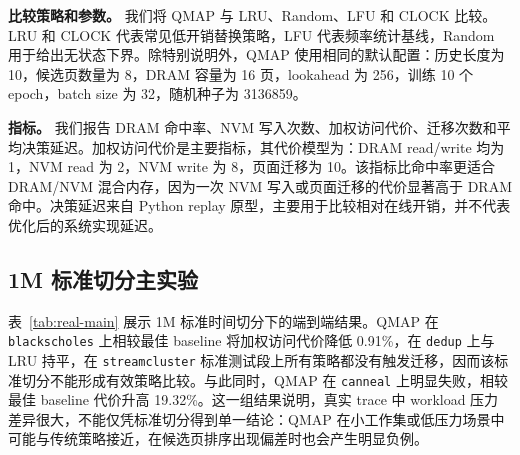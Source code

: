 \textbf{比较策略和参数。}
我们将 QMAP 与 LRU、Random、LFU 和 CLOCK 比较。LRU 和 CLOCK 代表常见低开销替换策略，LFU 代表频率统计基线，Random 用于给出无状态下界。除特别说明外，QMAP 使用相同的默认配置：历史长度为 10，候选页数量为 8，DRAM 容量为 16 页，lookahead 为 256，训练 10 个 epoch，batch size 为 32，随机种子为 3136859。

\textbf{指标。}
我们报告 DRAM 命中率、NVM 写入次数、加权访问代价、迁移次数和平均决策延迟。加权访问代价是主要指标，其代价模型为：DRAM read/write 均为 1，NVM read 为 2，NVM write 为 8，页面迁移为 10。该指标比命中率更适合 DRAM/NVM 混合内存，因为一次 NVM 写入或页面迁移的代价显著高于 DRAM 命中。决策延迟来自 Python replay 原型，主要用于比较相对在线开销，并不代表优化后的系统实现延迟。

\subsection{1M 标准切分主实验}

表~\ref{tab:real-main} 展示 1M 标准时间切分下的端到端结果。QMAP 在 \texttt{blackscholes} 上相较最佳 baseline 将加权访问代价降低 0.91\%，在 \texttt{dedup} 上与 LRU 持平，在 \texttt{streamcluster} 标准测试段上所有策略都没有触发迁移，因而该标准切分不能形成有效策略比较。与此同时，QMAP 在 \texttt{canneal} 上明显失败，相较最佳 baseline 代价升高 19.32\%。这一组结果说明，真实 trace 中 workload 压力差异很大，不能仅凭标准切分得到单一结论：QMAP 在小工作集或低压力场景中可能与传统策略接近，在候选页排序出现偏差时也会产生明显负例。

